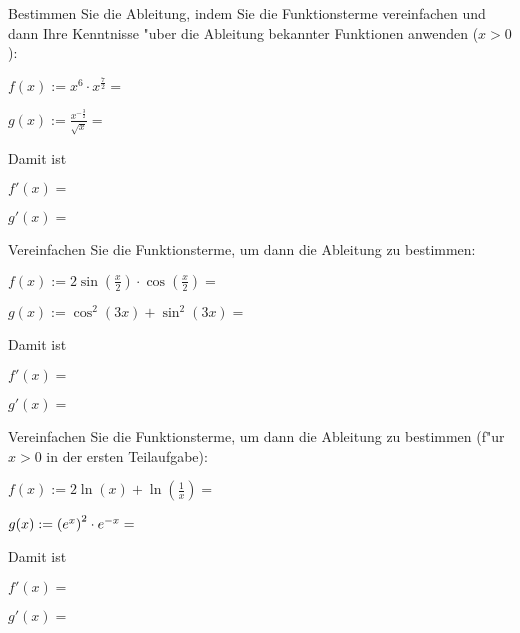 \begin{MExercises}

\begin{MExercise}
Bestimmen Sie die Ableitung, indem Sie die Funktionsterme vereinfachen und 
dann Ihre Kenntnisse "uber die Ableitung bekannter Funktionen anwenden
($x > 0$):
\begin{MExerciseItems}
\item $f(x) := x^6 \cdot x^{\frac{7}{2}} = $
\item $g(x) := \frac{x^{-\frac{3}{2}}}{\sqrt{x}} = $
\end{MExerciseItems}
Damit ist
\begin{MExerciseItems}
\item $f'(x) = $ 
\item $g'(x) = $ 
\end{MExerciseItems}
\end{MExercise}

\begin{MExercise}
Vereinfachen Sie die Funktionsterme, um dann die Ableitung zu bestimmen:
\begin{MExerciseItems}
\item
 $f(x) := 2 \sin\left(\frac{x}{2}\right) \cdot \cos\left(\frac{x}{2}\right) = $ %
\item $g(x) := \cos^2(3 x) + \sin^2(3 x) = $ %
\end{MExerciseItems}
Damit ist
\begin{MExerciseItems}
\item $f'(x) = $ 
\item $g'(x) = $  
\end{MExerciseItems}
\end{MExercise}

\begin{MExercise}
Vereinfachen Sie die Funktionsterme, um dann die Ableitung zu bestimmen
(f"ur $x > 0$ in der ersten Teilaufgabe):
\begin{MExerciseItems}
\item $f(x) := 2 \ln(x) + \ln\left(\frac{1}{x}\right) = $
\item $g(x) := \left(e^x\right)^2 \cdot e^{-x} = $
\end{MExerciseItems}
Damit ist
\begin{MExerciseItems}
\item $f'(x) = $ 
\item $g'(x) = $ 
\end{MExerciseItems}
\end{MExercise}

\end{MExercises}



